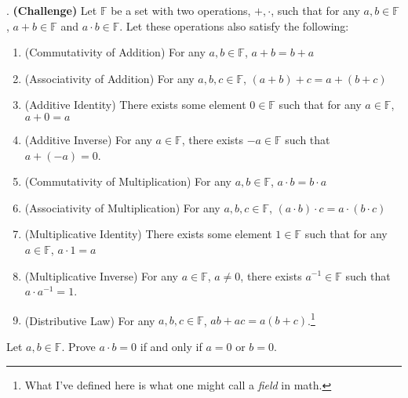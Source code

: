 . \textbf{(Challenge)}
Let $\mathbb{F}$ be a set with two operations, $+,\cdot$, 
such that for any $a,b\in \mathbb{F}$, $a+b \in \mathbb{F}$ and $a \cdot b \in \mathbb{F}$.
Let these operations also satisfy the following:
\begin{enumerate}[label=(A\arabic*)]
	\item  (Commutativity of Addition) For any $a,b\in\mathbb{F}$, $a+b=b+a$
	\item  (Associativity of Addition) For any $a,b,c\in\mathbb{F}$, $(a+b)+c=a + (b+c)$
	\item (Additive Identity) There exists some element $0\in \mathbb{F}$ such that for any $a\in \mathbb{F}$, $a+0=a$
	\item (Additive Inverse) For any $a\in \mathbb{F}$, there exists $-a\in \mathbb{F}$ such that $a+(-a)=0$.
	\item (Commutativity of Multiplication) For any $a,b\in\mathbb{F}$, $a\cdot b=b \cdot a$
	\item  (Associativity of Multiplication) For any $a,b,c\in\mathbb{F}$, $(a\cdot b)\cdot c=a \cdot (b\cdot c)$
	\item (Multiplicative Identity) There exists some element $1\in \mathbb{F}$ such that for any $a\in \mathbb{F}$, $a\cdot 1=a$
	\item (Multiplicative Inverse) For any $a\in \mathbb{F}$, $a\neq 0$, there exists $a^{-1}\in \mathbb{F}$ such that $a\cdot a^{-1}=1$.
	\item (Distributive Law) For any $a,b,c\in \mathbb{F}$, $ab+ac=a(b+c)$.\footnote{What I've defined here is what one might call a \textit{field} in math.}
\end{enumerate}
Let $a,b\in \mathbb{F}$.
Prove $a\cdot b=0$ if and only if $a=0$ or $b=0$.





















